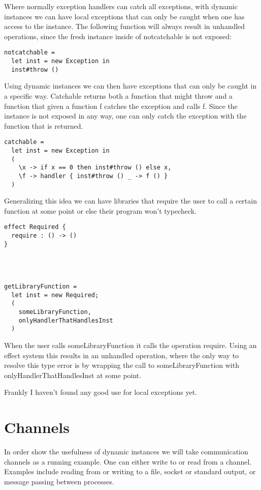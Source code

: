 \documentclass[12pt]{article}
\begin{document}
Where normally exception handlers can catch all exceptions, with dynamic instances we can have local exceptions that can only be caught when one has access to the instance.
The following function will always result in unhandled operations, since the fresh instance inside of notcatchable is not exposed:

\begin{verbatim}
notcatchable =
  let inst = new Exception in
  inst#throw ()
\end{verbatim}

Using dynamic instances we can then have exceptions that can only be caught in a specific way.
Catchable returns both a function that might throw and a function that given a function f catches the exception and calls f.
Since the instance is not exposed in any way, one can only catch the exception with the function that is returned.

\begin{verbatim}
catchable =
  let inst = new Exception in
  (
    \x -> if x == 0 then inst#throw () else x,
    \f -> handler { inst#throw () _ -> f () }
  )
\end{verbatim}

Generalizing this idea we can have libraries that require the user to call a certain function at some point or else their program won't typecheck.

\begin{verbatim}
effect Required {
  require : () -> ()
}




getLibraryFunction =
  let inst = new Required;
  (
    someLibraryFunction,
    onlyHandlerThatHandlesInst
  )
\end{verbatim}

When the user calls someLibraryFunction it calls the operation require.
Using an effect system this results in an unhandled operation, where the only way to resolve this type error is by wrapping the call to someLibraryFunction with onlyHandlerThatHandlesInst at some point.

Frankly I haven't found any good use for local exceptions yet.

\section{Channels}

In order show the usefulness of dynamic instances we will take communication channels as a running example.
One can either write to or read from a channel.
Examples include reading from or writing to a file, socket or standard output, or message passing between processes.
\end{document}
